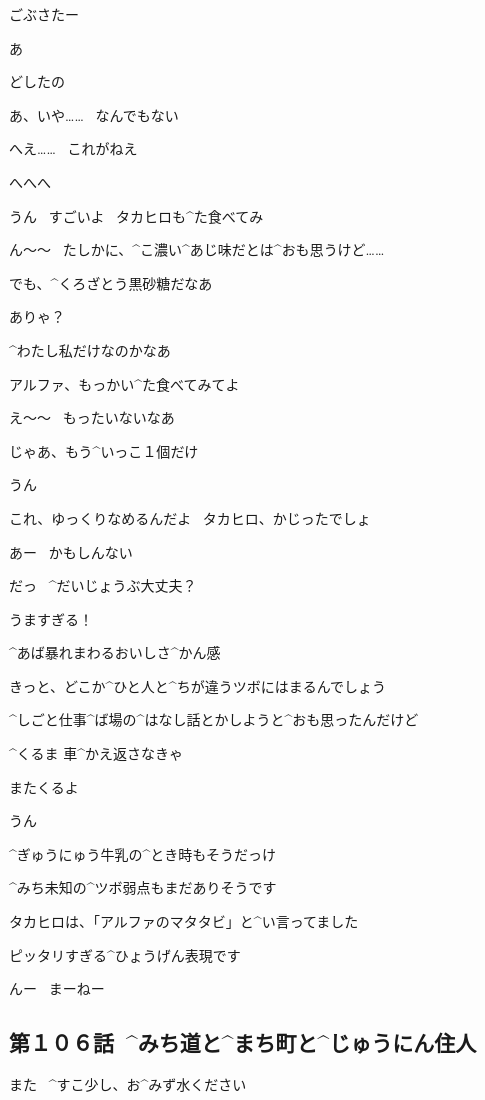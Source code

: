 \page
\T ごぶさたー

\A あ

\T どしたの

\A あ、いや……
\ なんでもない

\page
\T へえ……
\ これがねえ

\A へへへ

\A うん
\ すごいよ
\ タカヒロも^{た}{食}べてみ

\T ん〜〜
\ たしかに、^{こ}{濃}い^{あじ}{味}だとは^{おも}{思}うけど……

\T でも、^{くろざとう}{黒砂糖}だなあ

\A ありゃ？

\page
\A ^{わたし}{私}だけなのかなあ

\T アルファ、もっかい^{た}{食}べてみてよ

\A え〜〜
\ もったいないなあ

\A じゃあ、もう^{いっこ}{１個}だけ

\T うん

\A これ、ゆっくりなめるんだよ
\ タカヒロ、かじったでしょ

\T あー
\ かもしんない

\page[82]
\T だっ
\ ^{だいじょうぶ}{大丈夫}？

\A うますぎる！

\page
\A ^{あば}{暴}れまわるおいしさ^{かん}{感}

\A きっと、どこか^{ひと}{人}と^{ちが}{違}うツボにはまるんでしょう

\T ^{しごと}{仕事}^{ば}{場}の^{はなし}{話}とかしようと^{おも}{思}ったんだけど

\T ^{くるま }{車}^{かえ}{返}さなきゃ

\T またくるよ

\A うん

\A ^{ぎゅうにゅう}{牛乳}の^{とき}{時}もそうだっけ

\A ^{みち}{未知}の^{ツボ}{弱点}もまだありそうです

\page
\A タカヒロは、「アルファのマタタビ」と^{い}{言}ってました

\A ピッタリすぎる^{ひょうげん}{表現}です

\A んー
\ まーねー


\subsection{第１０６話\ ^{みち}{道}と^{まち}{町}と^{じゅうにん}{住人}}

\page[87]
\A また
\ ^{すこ}{少}し、お^{みず}{水}ください

